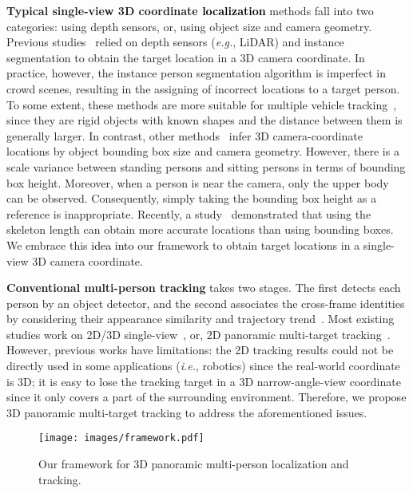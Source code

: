 \documentclass{article}
\newcommand{\ie}{{\it i.e.}}
\newcommand{\eg}{{\it e.g.}}
\newcommand{\YangProof}[1]{\textcolor{black}{#1}}
\begin{document}
\textbf{Typical single-view 3D coordinate \YangProof{localization}} methods fall into two categories: using depth sensors, or, using object size and camera geometry. Previous studies~\cite{osep2017combined,kollmitz2019deep} relied on depth sensors (\eg, LiDAR) and instance segmentation to obtain the target location in a 3D camera coordinate. In practice, however, the instance person segmentation algorithm is imperfect in crowd scenes, resulting in the assigning of incorrect locations to a target person. To some extent, these methods are more suitable for multiple vehicle tracking~\cite{cho2014multi}, since they are rigid objects with known shapes and the distance between them is generally larger. In contrast, other methods~\cite{scheidegger2018mono,sharma2018beyond} infer 3D camera-coordinate locations by object bounding box size and camera geometry. However, there is a scale variance between standing persons and sitting persons in terms of bounding box height. Moreover, when a person is near the camera, only the upper body can be observed. Consequently, simply taking the bounding box height as a reference is inappropriate. Recently, a study~\cite{bertoni2019monoloco} demonstrated that using the skeleton length can obtain more accurate locations than using bounding boxes. We embrace this \YangProof{idea into} our framework to obtain target locations in a single-view 3D camera coordinate. 

\textbf{Conventional multi-person tracking} takes two stages. The first detects each person by an object detector, and the second associates the cross-frame identities by considering their appearance similarity and trajectory trend~\cite{yu2016poi, wojke2017simple}. Most existing studies work on 2D/3D single-view~\cite{kollmitz2019deep, sharma2018beyond}, or, 2D panoramic multi-target tracking~\cite{ delforouzi2019deep,delforouzi2019polar}. However, previous works have limitations: the 2D tracking results could not be directly used in some applications (\ie, robotics) since the real-world coordinate is 3D; it is easy to lose the tracking target in a 3D narrow-angle-view coordinate since it only covers a part of the surrounding environment. Therefore, we propose 3D panoramic multi-target tracking to address the aforementioned issues.

\begin{figure*}[!h]
\centering
  \texttt{[image: images/framework.pdf]}
  \vspace{-3mm}
  \caption{Our framework for 3D panoramic multi-person localization and tracking.}
  \label{fig:framework}
\end{figure*}
\end{document}
